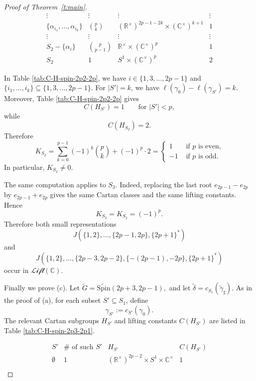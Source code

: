 \documentclass{amsart}
\newcommand{\LLift}{\mathscr{Lift}}
\newcommand{\bbC}{{\mathbb{C}}}
\newcommand{\bbR}{{\mathbb R}}
\newcommand{\Spin}{{\mathrm{Spin}}}
\theoremstyle{definition}
\newcommand{\tu}{\widetilde}
\begin{document}
\begin{proof}[Proof of Theorem~\ref{t:main}]
\begin{table}[!htbp]
\[\begin{array}{c|c|c|c}
\vdots
&
\vdots
&
\vdots
&
\vdots
\\

\{\alpha_{i_1},\ldots,\alpha_{i_k}\}
&
{p\choose k}
&
(\bbR^\times)^{2p-1-2k}\times(\bbC^\times)^{k+1}
&
1
\\

\vdots
&
\vdots
&
\vdots
&
\vdots
\\

S_2-\{\alpha_i\}
&
{p\choose p-1}
&
\bbR^\times\times(\bbC^\times)^p
&
1
\\

S_2
&
1
&
S^1\times(\bbC^\times)^p
&
2
\end{array}
\]
\caption{The Cartan subgroups \(H_{S'}\) and lifting constants \(C(H_{S'})\) for \(S'\subseteq S_2\) in the case \(G=\Spin(2p+2,2p)\).}
\label{tab:C-H-spin-2p2-2p}
\end{table}

In Table \ref{tab:C-H-spin-2p2-2p}, we have
$i\in\{1,3,\ldots,2p-1\}$ and $\{i_1,\ldots,i_k\}\subseteq\{1,3,\ldots,2p-1\}.$
For \(|S'|=k\), we have
$\ell(\gamma_0)-\ell(\gamma_{S'})=k.$
Moreover, Table \ref{tab:C-H-spin-2p2-2p} gives
\[
C(H_{S'})=1
\qquad\text{for } |S'|<p,
\]
while
\[
C(H_{S_2})=2.
\]
Therefore
$$
K_{S_2}
=
\sum_{k=0}^{p-1}
(-1)^k {p\choose k} + (-1)^p\cdot 2 
=
\begin{cases}
1& \text{ if $p$ is even,}\\
-1 & \text{ if $p$  is odd}. 
\end{cases}
$$
In particular, \(K_{S_2}\neq 0\).

The same computation applies to \(S_3\). Indeed, replacing the last root
\(e_{2p-1}-e_{2p}\) by \(e_{2p-1}+e_{2p}\) gives the same Cartan classes and
the same lifting constants. Hence
\[
K_{S_3}=K_{S_2}=(-1)^p.
\]
Therefore both small representations
\[
J(\{1,2\},\ldots,\{2p-1,2p\},\{2p+1\}^*)
\]
and
\[
J(\{1,2\},\ldots,\{2p-3,2p-2\}, \{-(2p-1),-2p\},\{2p+1\}^*)
\]
occur in \(\LLift(\bbC)\).




Finally we prove (c). Let
$\tu G=\tu{\Spin}(2p+3,2p-1),$
and let
$\tu\delta=c_{S_1}(\tu\gamma_\sharp).$
As in the proof of (a), for each subset \(S'\subseteq S_1\), define
\[
\gamma_{S'}:=c_{S'}(\gamma_0).
\]
The relevant Cartan subgroups \(H_{S'}\) and lifting constants \(C(H_{S'})\)
are listed in Table \ref{tab:C-H-spin-2p3-2p1}.

\begin{table}[!htbp]
\centering
\renewcommand{\arraystretch}{1.35}
\[
\begin{array}{c|c|c|c}
S' & \#\text{ of such }S' & H_{S'} & C(H_{S'}) \\
\hline
\emptyset
&
1
&
(\bbR^\times)^{2p-2}\times S^1\times \bbC^\times
&
1
\\


\end{array}\]
\end{table}
\end{proof}
\end{document}
